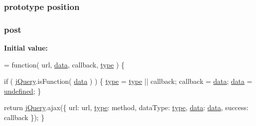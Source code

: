 \subsubsection[{position}]{ {\bf prototype} position}\label{jquery-1_810_82-vsdoc_8js_a0a2a38b3281bb5c9cf0c479a04b513cb}
\hypertarget{jquery-1_810_82-vsdoc_8js_ab2cf0610f8e671450cfe070adfd73a8a}{}
\subsubsection[{post}]{ post}\label{jquery-1_810_82-vsdoc_8js_ab2cf0610f8e671450cfe070adfd73a8a}
{\bfseries Initial value\+:}
\begin{DoxyCode}
= \textcolor{keyword}{function}( url, \hyperlink{jquery-1_810_82-vsdoc_8js_a609407b3456fdc3c5671a9fc4a226ff7}{data}, callback, \hyperlink{jquery-1_810_82-vsdoc_8js_a3940565e83a9bfd10d95ffd27536da91}{type} ) \{


        
        \textcolor{keywordflow}{if} ( \hyperlink{jquery-1_810_82-vsdoc_8js_add5237586d970a38a81f990e8eb28c6c}{jQuery}.isFunction( \hyperlink{jquery-1_810_82-vsdoc_8js_a609407b3456fdc3c5671a9fc4a226ff7}{data} ) ) \{
            \hyperlink{jquery-1_810_82-vsdoc_8js_a3940565e83a9bfd10d95ffd27536da91}{type} = \hyperlink{jquery-1_810_82-vsdoc_8js_a3940565e83a9bfd10d95ffd27536da91}{type} || callback;
            callback = \hyperlink{jquery-1_810_82-vsdoc_8js_a609407b3456fdc3c5671a9fc4a226ff7}{data};
            \hyperlink{jquery-1_810_82-vsdoc_8js_a609407b3456fdc3c5671a9fc4a226ff7}{data} = \hyperlink{jquery-1_810_82-vsdoc_8js_a08113a236cc18d2a9d5ce27e638012be}{undefined};
        \}

        \textcolor{keywordflow}{return} \hyperlink{jquery-1_810_82-vsdoc_8js_add5237586d970a38a81f990e8eb28c6c}{jQuery}.ajax(\{
            url: url,
            \hyperlink{jquery-1_810_82-vsdoc_8js_a3940565e83a9bfd10d95ffd27536da91}{type}: method,
            dataType: \hyperlink{jquery-1_810_82-vsdoc_8js_a3940565e83a9bfd10d95ffd27536da91}{type},
            \hyperlink{jquery-1_810_82-vsdoc_8js_a609407b3456fdc3c5671a9fc4a226ff7}{data}: \hyperlink{jquery-1_810_82-vsdoc_8js_a609407b3456fdc3c5671a9fc4a226ff7}{data},
            success: callback
        \});
    \}
\end{DoxyCode}
\hypertarget{jquery-1_810_82-vsdoc_8js_a2d1a98145e139b1aea1d95967466b151}{}
